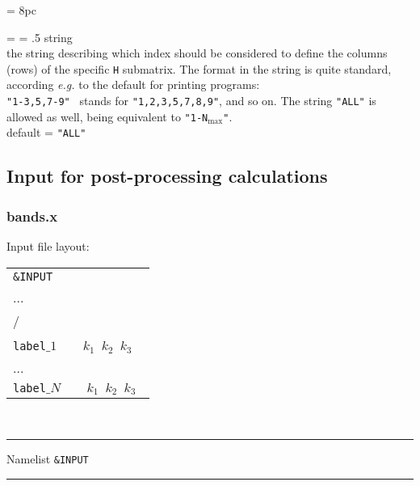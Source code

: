 \newdimen\descindent \descindent = 8pc
{\noindent \leftskip = \descindent \parskip = .5\baselineskip
{}%
{\sc string} \\
the string describing which index should be considered to define the
columns (rows) of the specific {\tt H} submatrix.
The format in the string is quite standard, according {\it e.g.} to the default
for printing programs: \\
{\tt  "1-3,5,7-9" } stands for {\tt "1,2,3,5,7,8,9"}, and so on.
The string {\tt "ALL"} is allowed as well, being equivalent to
{\tt "1-N$_{\text{max}}$"}. \\
{\sc default} = {\tt "ALL"} \par

}

\subsection{Input for post-processing calculations}
\subsubsection{bands.x}
\noindent Input file layout: \\

%
%
\begin{tabular}{l}
 {\tt \&INPUT} \\
   ... \\
   / \\
  \\
 {\tt label$\_1$ $\quad$ $k_1$ $k_2$ $k_3$ } \\
  ... \\
 {\tt label$\_N$ $\quad$ $k_1$ $k_2$ $k_3$ } \\
\end{tabular}
%
%
\\

\begin{centering}
\rule{2.2in}{0.01in} Namelist {\tt \&INPUT} \rule{2.2in}{0.01in}
\end{centering}\\

